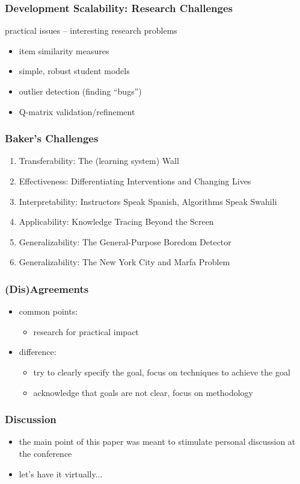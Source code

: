 \documentclass[bigger]{beamer}
\begin{document}
\begin{frame}
  \frametitle{Development Scalability: Research Challenges}

  practical issues -- interesting research problems

  \begin{itemize}
  \item item similarity measures
  \item simple, robust student models
  \item outlier detection (finding ``bugs'')
  \item Q-matrix validation/refinement
  \end{itemize}
\end{frame}

\begin{frame}
  \frametitle{Baker's Challenges}

  \begin{enumerate}
  \item Transferability: The (learning system) Wall
  \item Effectiveness: Differentiating Interventions and Changing Lives 
  \item Interpretability: Instructors Speak Spanish, Algorithms Speak Swahili
  \item Applicability: Knowledge Tracing Beyond the Screen
  \item Generalizability: The General-Purpose Boredom Detector
  \item Generalizability: The New York City and Marfa Problem
  \end{enumerate}
\end{frame}

\begin{frame}
  \frametitle{(Dis)Agreements}

  \begin{itemize}
  \item common points:
    \begin{itemize}
    \item research for practical impact
    \end{itemize}
  \item difference:
    \begin{itemize}
    \item try to clearly specify the goal, focus on techniques to achieve the
      goal
    \item acknowledge that goals are not clear, focus on methodology
    \end{itemize}
  \end{itemize}
\end{frame}

\begin{frame}
  \frametitle{Discussion}

  \begin{itemize}
  \item the main point of this paper was meant to stimulate personal discussion
    at the conference
  \item let's have it virtually...
  \end{itemize}
\end{frame}
\end{document}
